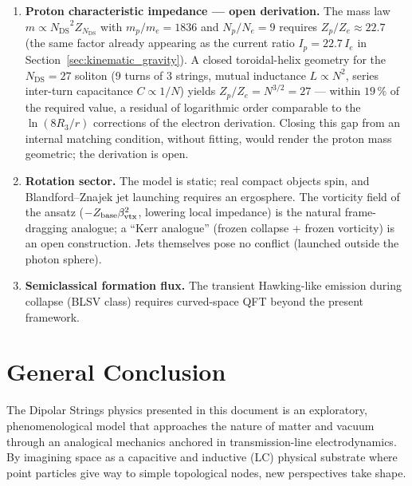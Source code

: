 \documentclass[11pt,a4paper]{article}
\theoremstyle{plain}
\theoremstyle{remark}
\newcommand{\Ncd}{\ensuremath{N_{\mathrm{DS}}}}
\begin{document}
\begin{enumerate}
    \item \textbf{Proton characteristic impedance --- open derivation.} The mass law $m \propto \Ncd^2 Z_{\Ncd}$ with $m_p/m_e = 1836$ and $N_p/N_e = 9$ requires $Z_p/Z_e \approx 22.7$ (the same factor already appearing as the current ratio $I_p = 22.7\,I_e$ in Section~\ref{sec:kinematic_gravity}). A closed toroidal-helix geometry for the $\Ncd = 27$ soliton (9 turns of 3 strings, mutual inductance $L \propto N^2$, series inter-turn capacitance $C \propto 1/N$) yields $Z_p/Z_e = N^{3/2} = 27$ --- within $19\,\%$ of the required value, a residual of logarithmic order comparable to the $\ln(8R_3/r)$ corrections of the electron derivation. Closing this gap from an internal matching condition, without fitting, would render the proton mass geometric; the derivation is open.
    \item \textbf{Rotation sector.} The model is static; real compact objects spin, and Blandford--Znajek jet launching requires an ergosphere. The vorticity field of the ansatz ($-Z_{\rm base}\beta^2_{\rm vtx}$, lowering local impedance) is the natural frame-dragging analogue; a ``Kerr analogue'' (frozen collapse + frozen vorticity) is an open construction. Jets themselves pose no conflict (launched outside the photon sphere).
    \item \textbf{Semiclassical formation flux.} The transient Hawking-like emission during collapse (BLSV class) requires curved-space QFT beyond the present framework.
\end{enumerate}

\section{General Conclusion}
The Dipolar Strings physics presented in this document is an exploratory, phenomenological model that approaches the nature of matter and vacuum through an analogical mechanics anchored in transmission-line electrodynamics. By imagining space as a capacitive and inductive (LC) physical substrate where point particles give way to simple topological nodes, new perspectives take shape.
\end{document}
